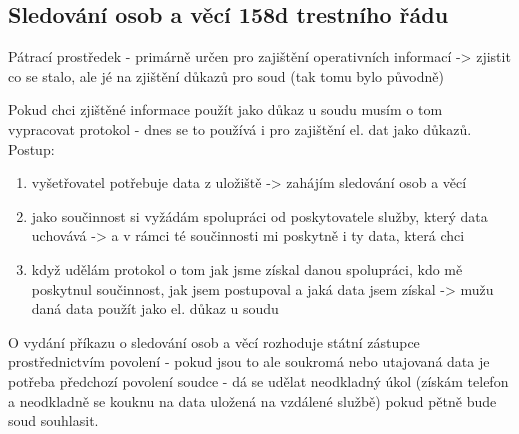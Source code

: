 \subsection*{Sledování osob a věcí 158d trestního řádu}
Pátrací prostředek - primárně určen pro zajištění operativních informací -> zjistit co se
stalo, ale jé na zjištění důkazů pro soud (tak tomu bylo původně)

Pokud chci zjištěné informace použít jako důkaz u soudu musím o tom vypracovat protokol - dnes se to používá i pro
zajištění el. dat jako důkazů. Postup:
\begin{enumerate}
    \item vyšetřovatel potřebuje data z uložiště -> zahájím sledování osob a věcí
    \item jako součinnost si vyžádám spolupráci od poskytovatele služby, který data uchovává -> a v rámci té součinnosti mi poskytně i ty data, která chci
    \item když udělám protokol o tom jak jsme získal danou spolupráci, kdo mě poskytnul součinnost, jak jsem postupoval a jaká data jsem získal -> mužu daná data použít jako el. důkaz u soudu
\end{enumerate}
O vydání příkazu o sledování osob a věcí rozhoduje státní zástupce prostřednictvím povolení - pokud jsou to ale soukromá nebo utajovaná data je potřeba předchozí povolení soudce - dá se udělat neodkladný úkol (získám telefon a neodkladně se kouknu na data uložená na vzdálené službě) pokud pětně bude soud souhlasit.

